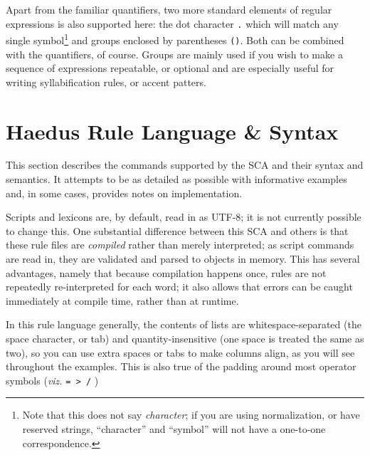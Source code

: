 \documentclass[10pt,letterpaper]{article}
\begin{document}
Apart from the familiar quantifiers, two more standard elements of regular expressions is also supported here: the dot character \texttt{.} which will match any single symbol\footnote{Note that this does not say \emph{character}; if you are using normalization, or have reserved strings, ``character'' and ``symbol'' will not have a one-to-one correspondence.} and groups enclosed by parentheses \texttt{()}. Both can be combined with the quantifiers, of course. Groups are mainly used if you wish to make a sequence of expressions repeatable, or optional and are especially useful for writing syllabification rules, or accent patters.



\section{Haedus Rule Language \& Syntax}
\label{sec:scripts_and_syntax}
This section describes the commands supported by the SCA and their syntax and semantics. It attempts to be as detailed as possible with informative examples and, in some cases, provides notes on implementation.

Scripts and lexicons are, by default, read in as UTF-8; it is not currently possible to change this. One substantial difference between this SCA and others is that these rule files are \emph{compiled} rather than merely interpreted; as script commands are read in, they are validated and parsed to objects in memory. This has several advantages, namely that because compilation happens once, rules are not repeatedly re-interpreted for each word; it also allows that errors can be caught immediately at compile time, rather than at runtime.

In this rule language generally, the contents of lists are whitespace-separated (the space character, or tab) and quantity-insensitive (one space is treated the same as two), so you can use extra spaces or tabs to make columns align, as you will see throughout the examples. This is also true of the padding around most operator symbols (\emph{viz.} \texttt{= > /} )

\end{document}
